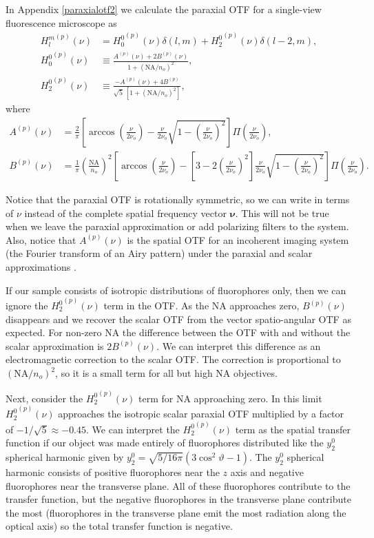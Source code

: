 \documentclass[11pt]{article}
\providecommand{\bs}[1]{\boldsymbol{#1}}
\begin{document}
In Appendix \ref{paraxialotf2} we calculate the paraxial OTF for a single-view
fluorescence microscope as
\begin{align}
  {H_l^m}^{(p)}(\nu) &= {H_0^0}^{(p)}(\nu)\delta(l, m) + {H_2^0}^{(p)}(\nu)\delta(l-2, m), \label{eq:fullotf} \\
  {H_0^0}^{(p)}(\nu) &\equiv \frac{A^{(p)}(\nu) + 2B^{(p)}(\nu)}{1 + (\text{NA}/n_o)^2},\\
  {H_2^0}^{(p)}(\nu) &\equiv \frac{-A^{(p)}(\nu) + 4B^{(p)}}{\sqrt{5}\, [1 + (\text{NA}/n_o)^2]},
\end{align}
where
\begin{align}
  {A}^{(p)}(\nu) &= \frac{2}{\pi}\left[\arccos\left(\frac{\nu}{2\nu_o}\right) - \frac{\nu}{2\nu_o}\sqrt{1 - \left(\frac{\nu}{2\nu_o}\right)^2}\right]\Pi\left(\frac{\nu}{2\nu_o}\right),\\
  B^{(p)}(\nu) &= \frac{1}{\pi}\left(\frac{\text{NA}}{n_o}\right)^2\left[\arccos\left(\frac{\nu}{2\nu_o}\right) - \left[3 - 2\left(\frac{\nu}{2\nu_o}\right)^2\right]\frac{\nu}{2\nu_o} \sqrt{1 - \left(\frac{\nu}{2\nu_o}\right)^2}\right]\Pi\left(\frac{\nu}{2\nu_o}\right).                 
\end{align}

Notice that the paraxial OTF is rotationally symmetric, so we can write in terms
of $\nu$ instead of the complete spatial frequency vector $\bs{\nu}$. This will
not be true when we leave the paraxial approximation or add polarizing filters
to the system. Also, notice that ${A}^{(p)}(\nu)$ is the spatial OTF for an
incoherent imaging system (the Fourier transform of an Airy pattern) under the
paraxial and scalar approximations \cite{goodman1996}.

If our sample consists of isotropic distributions of fluorophores only, then we
can ignore the ${H_2^0}^{(p)}(\nu)$ term in the OTF. As the NA approaches zero,
${B}^{(p)}(\nu)$ disappears and we recover the scalar OTF from the vector
spatio-angular OTF as expected. For non-zero NA the difference between the OTF
with and without the scalar approximation is $2{B}^{(p)}(\nu)$. We can interpret
this difference as an electromagnetic correction to the scalar OTF. The
correction is proportional to $\left(\text{NA}/{n_o}\right)^2$, so it is a small term
for all but high NA objectives.

Next, consider the ${H_2^0}^{(p)}(\nu)$ term for NA approaching zero. In this
limit ${H_2^0}^{(p)}(\nu)$ approaches the isotropic scalar paraxial OTF
multiplied by a factor of $-1/\sqrt{5} \approx -0.45$. We can interpret the
${H_2^0}^{(p)}(\nu)$ term as the spatial transfer function if our object was
made entirely of fluorophores distributed like the $y_2^0$ spherical harmonic
given by $y_2^0 = \sqrt{5/16\pi}(3\cos^2\vartheta -1)$. The $y_2^0$ spherical
harmonic consists of positive fluorophores near the $z$ axis and negative
fluorophores near the transverse plane. All of these fluorophores contribute to
the transfer function, but the negative fluorophores in the transverse plane
contribute the most (fluorophores in the transverse plane emit the most
radiation along the optical axis) so the total transfer function is negative.
\end{document}
